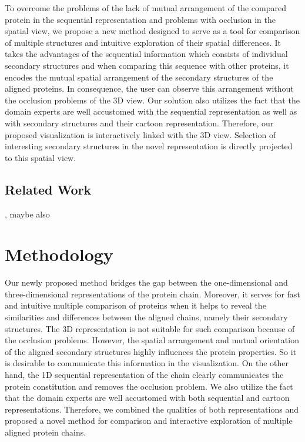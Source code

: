 \documentclass[twocolumn]{bmcart}%
\begin{document}
To overcome the problems of the lack of mutual arrangement of the compared protein in the sequential representation and problems with occlusion in the spatial view, we propose a new method designed to serve as a tool for comparison of multiple structures and intuitive exploration of their spatial differences.
It takes the advantages of the sequential information which consists of individual secondary structures and when comparing this sequence with other proteins, it encodes the mutual spatial arrangement of the secondary structures of the aligned proteins.
In consequence, the user can observe this arrangement without the occlusion problems of the 3D view.
Our solution also utilizes the fact that the domain experts are well accustomed with the sequential representation as well as with secondary structures and their cartoon representation. 
Therefore, our proposed visualization is interactively linked with the 3D view.
Selection of interesting secondary structures in the novel representation is directly projected to this spatial view. 

\subsection*{Related Work}

\cite{Stolte2015}, maybe also \cite{Nguyen2013}

\section*{Methodology}
Our newly proposed method bridges the gap between the one-dimensional and three-dimensional representations of the protein chain.
Moreover, it serves for fast and intuitive multiple comparison of proteins when it helps to reveal the similarities and differences between the aligned chains, namely their secondary structures.
The 3D representation is not suitable for such comparison because of the occlusion problems.
However, the spatial arrangement and mutual orientation of the aligned secondary structures highly influences the protein properties.
So it is desirable to communicate this information in the visualization.
On the other hand, the 1D sequential representation of the chain clearly communicates the protein constitution and removes the occlusion problem.
We also utilize the fact that the domain experts are well accustomed with both sequential and cartoon representations.
Therefore, we combined the qualities of both representations and proposed a novel method for comparison and interactive exploration of multiple aligned protein chains.
\end{document}
